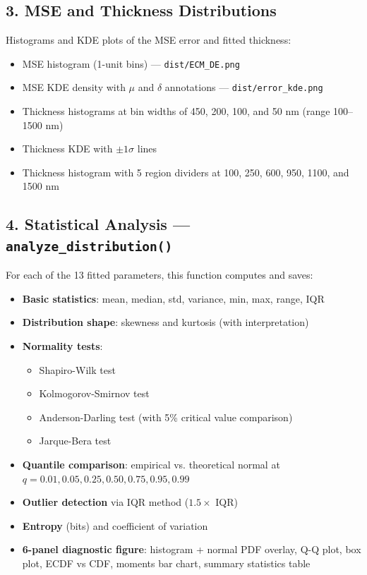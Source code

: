 \documentclass[11pt,a4paper]{article}
\begin{document}
\subsection{3. MSE and Thickness Distributions}
Histograms and KDE plots of the MSE error and fitted thickness:
\begin{itemize}
    \item MSE histogram (1-unit bins) --- {\tt dist/ECM\_DE.png}
    \item MSE KDE density with $\mu$ and $\delta$ annotations --- {\tt dist/error\_kde.png}
    \item Thickness histograms at bin widths of 450, 200, 100, and 50 nm (range 100--1500 nm)
    \item Thickness KDE with $\pm 1\sigma$ lines
    \item Thickness histogram with 5 region dividers at 100, 250, 600, 950, 1100, and 1500 nm
\end{itemize}

\subsection{4. Statistical Analysis --- {\tt analyze\_distribution()}}
For each of the 13 fitted parameters, this function computes and saves:
\begin{itemize}
    \item \textbf{Basic statistics}: mean, median, std, variance, min, max, range, IQR
    \item \textbf{Distribution shape}: skewness and kurtosis (with interpretation)
    \item \textbf{Normality tests}:
    \begin{itemize}
        \item Shapiro-Wilk test
        \item Kolmogorov-Smirnov test
        \item Anderson-Darling test (with 5\% critical value comparison)
        \item Jarque-Bera test
    \end{itemize}
    \item \textbf{Quantile comparison}: empirical vs. theoretical normal at $q = 0.01, 0.05, 0.25, 0.50, 0.75, 0.95, 0.99$
    \item \textbf{Outlier detection} via IQR method ($1.5 \times$ IQR)
    \item \textbf{Entropy} (bits) and coefficient of variation
    \item \textbf{6-panel diagnostic figure}: histogram + normal PDF overlay, Q-Q plot, box plot, ECDF vs CDF, moments bar chart, summary statistics table
\end{itemize}
\end{document}
